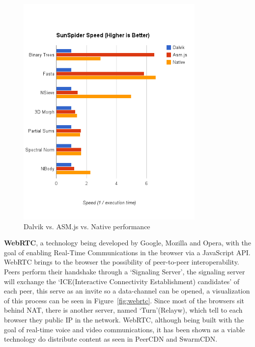\documentclass{./llncs2e/llncs}
\begin{document}
\begin{figure}[h!]
  \centering
  \includegraphics[width=0.82\textwidth]{img/Dalvik-vs-ASM-vs-Native-edited}
  \caption{Dalvik vs. ASM.js vs. Native performance}
  \label{fig:dan}
\end{figure}

\textbf{WebRTC}\cite{IanHickson2013}, a technology being developed by Google, Mozilla and Opera, with the goal of enabling Real-Time Communications in the browser via a JavaScript API. WebRTC brings to the browser the possibility of peer-to-peer interoperability. Peers perform their handshake through a `Signaling Server', the signaling server will exchange the `ICE(Interactive Connectivity Establishment) candidates' of each peer, this serve as an invite so a data-channel can be opened, a visualization of this process can be seen in Figure~\ref{fig:webrtc}. Since most of the browsers sit behind NAT, there is another server, named `Turn'(Relayw), which tell to each browser they public IP in the network. WebRTC, although being built with the goal of real-time voice and video communications, it has been shown as a viable technology do distribute content as seen in PeerCDN and SwarmCDN\cite{Vogt}.
\end{document}
